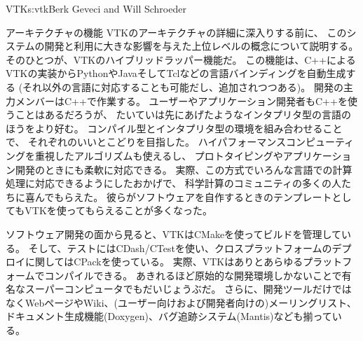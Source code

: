 \begin{aosachapter}{VTK}{s:vtk}{Berk Geveci and Will Schroeder}
\begin{aosasect1}{アーキテクチャの機能}
VTKのアーキテクチャの詳細に深入りする前に、
このシステムの開発と利用に大きな影響を与えた上位レベルの概念について説明する。
そのひとつが、VTKのハイブリッドラッパー機能だ。
この機能は、C++によるVTKの実装からPythonやJavaそしてTclなどの言語バインディングを自動生成する
(それ以外の言語に対応することも可能だし、追加されつつある)。
開発の主力メンバーはC++で作業する。
ユーザーやアプリケーション開発者もC++を使うことはあるだろうが、
たいていは先にあげたようなインタプリタ型の言語のほうをより好む。
コンパイル型とインタプリタ型の環境を組み合わせることで、
それぞれのいいとこどりを目指した。
ハイパフォーマンスコンピューティングを重視したアルゴリズムも使えるし、
プロトタイピングやアプリケーション開発のときにも柔軟に対応できる。
実際、この方式でいろんな言語での計算処理に対応できるようにしたおかげで、
科学計算のコミュニティの多くの人たちに喜んでもらえた。
彼らがソフトウェアを自作するときのテンプレートとしてもVTKを使ってもらえることが多くなった。

ソフトウェア開発の面から見ると、VTKはCMakeを使ってビルドを管理している。
そして、テストにはCDash/CTestを使い、クロスプラットフォームのデプロイに関してはCPackを使っている。
実際、VTKはありとあらゆるプラットフォームでコンパイルできる。
あきれるほど原始的な開発環境しかないことで有名なスーパーコンピュータでもだいじょうぶだ。
さらに、開発ツールだけではなくWebページやWiki、(ユーザー向けおよび開発者向けの)メーリングリスト、
ドキュメント生成機能(Doxygen)、バグ追跡システム(Mantis)なども揃っている。


\end{aosasect1}
\end{aosachapter}
